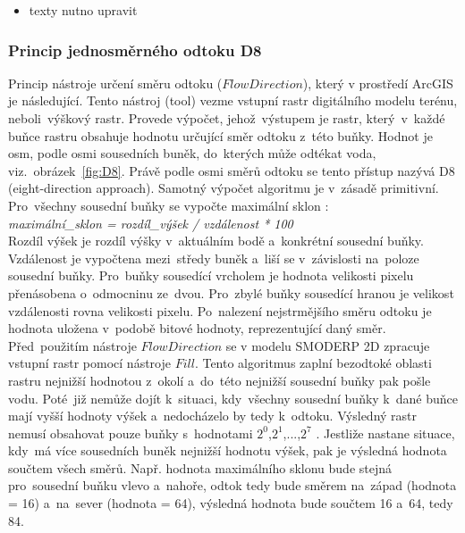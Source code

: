 \begin{itemize}
\item texty nutno upravit
\end{itemize}

\subsubsection{Princip jednosměrného odtoku D8} \label{subsection:d8}
Princip nástroje určení směru odtoku ($Flow Direction$), který v prostředí ArcGIS je následující. Tento nástroj (tool) vezme vstupní rastr digitálního modelu terénu, neboli~výškový rastr.
Provede výpočet, jehož~výstupem je rastr, který~v~každé buňce rastru obsahuje hodnotu určující směr odtoku z~této buňky. Hodnot je osm, podle osmi sousedních buněk, do~kterých může odtékat voda, viz.~obrázek~\ref{fig:D8}.
Právě podle osmi směrů odtoku se tento přístup nazývá D8 (eight-direction approach).
Samotný výpočet algoritmu je v~zásadě primitivní. Pro~všechny sousední buňky se vypočte maximální sklon \cite{d8}: \bigskip
\\ \textit{maximální\_sklon = rozdíl\_výšek / vzdálenost * 100}  \bigskip 
\\ Rozdíl výšek je rozdíl výšky v~aktuálním bodě a~konkrétní sousední buňky. Vzdálenost je vypočtena mezi~středy buněk a~liší se v~závislosti na~poloze sousední buňky. 
Pro~buňky sousedící vrcholem je hodnota velikosti pixelu přenásobena o~odmocninu ze~dvou. Pro~zbylé buňky sousedící hranou je velikost vzdálenosti rovna velikosti pixelu. 
Po~nalezení nejstrmějšího směru odtoku je hodnota uložena v~podobě bitové hodnoty, reprezentující daný směr. Před~použitím nástroje $Flow Direction$ se v modelu SMODERP 2D zpracuje vstupní rastr pomocí nástroje $Fill$.
Tento algoritmus zaplní bezodtoké oblasti rastru nejnižší hodnotou z~okolí a~do~této nejnižší sousední buňky pak pošle vodu.
Poté~již nemůže dojít k~situaci, kdy~všechny sousední buňky k~dané buňce mají vyšší hodnoty výšek a~nedocházelo by tedy k~odtoku.
Výsledný rastr nemusí obsahovat pouze buňky s~hodnotami $2^0$,$2^1$,...,$2^7$ \cite{flowdir}. Jestliže nastane situace, kdy~má více sousedních buněk nejnižší hodnotu výšek, pak je výsledná hodnota součtem všech směrů.
Např. hodnota maximálního sklonu bude stejná pro~sousední buňku vlevo a~nahoře, odtok tedy bude směrem na~západ (hodnota = 16) a~na~sever (hodnota = 64), výsledná hodnota bude součtem 16 a~64, tedy 84.

